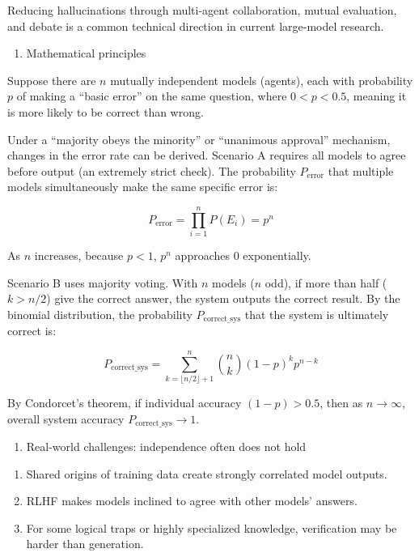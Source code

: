 Reducing hallucinations through multi-agent collaboration, mutual evaluation, and debate is a common technical direction in current large-model research.

\begin{enumerate}
\def\labelenumi{\arabic{enumi}.}
\tightlist
\item
  Mathematical principles
\end{enumerate}

Suppose there are \(n\) mutually independent models (agents), each with probability \(p\) of making a ``basic error'' on the same question, where \(0<p<0.5\), meaning it is more likely to be correct than wrong.

Under a ``majority obeys the minority'' or ``unanimous approval'' mechanism, changes in the error rate can be derived. Scenario A requires all models to agree before output (an extremely strict check). The probability \(P_{\mathrm{error}}\) that multiple models simultaneously make the same specific error is:

\[
P_{\mathrm{error}}=\prod_{i=1}^{n}P(E_i)=p^n
\]

As \(n\) increases, because \(p<1\), \(p^n\) approaches 0 exponentially.

Scenario B uses majority voting. With \(n\) models (\(n\) odd), if more than half (\(k>n/2\)) give the correct answer, the system outputs the correct result. By the binomial distribution, the probability \(P_{\mathrm{correct\_sys}}\) that the system is ultimately correct is:

\[
P_{\mathrm{correct\_sys}}=\sum_{k=\lfloor n/2\rfloor+1}^{n}\binom{n}{k}(1-p)^k p^{n-k}
\]

By Condorcet's theorem, if individual accuracy \((1-p)>0.5\), then as \(n\to\infty\), overall system accuracy \(P_{\mathrm{correct\_sys}}\to 1\).

\begin{enumerate}
\def\labelenumi{\arabic{enumi}.}
\setcounter{enumi}{1}
\tightlist
\item
  Real-world challenges: independence often does not hold
\end{enumerate}

\begin{enumerate}
\def\labelenumi{(\arabic{enumi})}
\item
  Shared origins of training data create strongly correlated model outputs.
\item
  RLHF makes models inclined to agree with other models' answers.
\item
  For some logical traps or highly specialized knowledge, verification may be harder than generation.
\end{enumerate}

